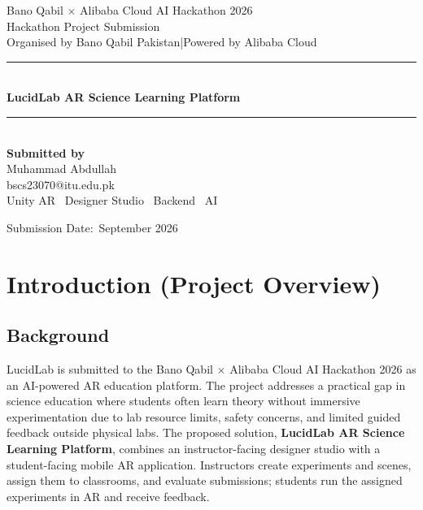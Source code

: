 \documentclass[12pt,a4paper]{article}
\newcommand{\hackathonname}{Bano Qabil $\times$ Alibaba Cloud AI Hackathon 2026}
\newcommand{\hackathonorg}{Bano Qabil Pakistan}
\newcommand{\cloudpartner}{Alibaba Cloud}
\newcommand{\projecttitle}{LucidLab AR Science Learning Platform}
\newcommand{\submissiondate}{September 2026}
\begin{document}
\AtBeginDocument{\justifying}

\begin{titlepage}
  \thispagestyle{empty}
  \begin{center}
    \vspace*{1.5cm}
    {\large \hackathonname}\\[0.3cm]
    {\large Hackathon Project Submission}\\[0.2cm]
    {\small Organised by \hackathonorg \quad|\quad Powered by \cloudpartner}\\[1.2cm]

    \rule{\textwidth}{1.2pt}\\[0.6cm]
    {\LARGE \bfseries \projecttitle}\\[0.4cm]
    \rule{\textwidth}{1.2pt}\\[1.4cm]

    {\large \bfseries Submitted by}\\[0.5cm]
    {\Large Muhammad Abdullah}\\[0.25cm]
    {\normalsize bscs23070@itu.edu.pk}\\[0.6cm]
    {\small Unity AR \textbullet\ Designer Studio \textbullet\ Backend \textbullet\ AI}

    \vfill
    {\normalsize Submission Date:\ \submissiondate}
  \end{center}
\end{titlepage}

\section{Introduction (Project Overview)}

\subsection{Background}

LucidLab is submitted to the Bano Qabil $\times$ Alibaba Cloud AI Hackathon 2026 as an
AI-powered AR education platform. The project addresses a practical gap in science
education where students often learn theory without immersive experimentation due to lab
resource limits, safety concerns, and limited guided feedback outside physical labs. The
proposed solution,
\textbf{LucidLab AR Science Learning Platform}, combines an instructor-facing designer
studio with a student-facing mobile AR application. Instructors create experiments and
scenes, assign them to classrooms, and evaluate submissions; students run the assigned
experiments in AR and receive feedback.
\end{document}

